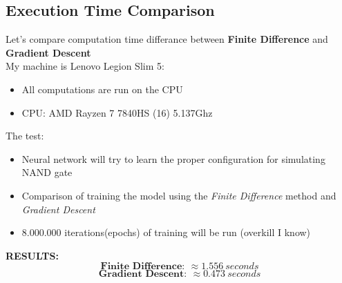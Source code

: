 \documentclass{article}
\begin{document}
\subsection{Execution Time Comparison}
Let's compare computation time differance between \textbf{Finite Difference} and \textbf{Gradient Descent}\\
My machine is Lenovo Legion Slim 5:
\begin{itemize}
    \item {All computations are run on the CPU}
    \item {CPU: AMD Rayzen 7 7840HS (16) 5.137Ghz}
\end{itemize}
The test:
\begin{itemize}
    \item {Neural network will try to learn the proper configuration for simulating NAND gate} 
    \item {Comparison of training the model using the \textit{Finite Difference} method and \textit{Gradient Descent}} 
    \item {8.000.000 iterations(epochs) of training will be run (overkill I know)} 
\end{itemize}
\textbf{RESULTS:}\\
\indent \[ \textbf{Finite Difference}:\ \approx 1.556\ seconds \]
\indent \[ \textbf{Gradient Descent}:\ \approx 0.473\ seconds \]
\end{document}
